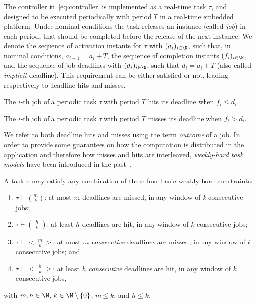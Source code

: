 The controller in~\eqref{eq:controller} is implemented as a real-time task $\tau$, and designed to be executed periodically with period $T$ in a real-time embedded platform.
Under nominal conditions the task releases an instance (called \emph{job}) in each period, that should be completed before the release of the next instance.
We denote the sequence of activation instants for $\tau$ with $(a_i)_{i \in \N}$, such that, in nominal conditions, $a_{i+1} = a_i+T$,  the sequence of completion instants $(f_i)_{i \in \N}$, and the sequence of job deadlines with $(d_i)_{i \in \N}$, such that $d_i = a_i + T$ (also called \emph{implicit} deadline).
This requirement can be either satisfied or not, leading respectively to deadline hits and misses.
%
\begin{definition}%
\label{def:hit}%
    The $i$-th job of a periodic task $\tau$ with period $T$ hits its deadline when $f_i \leq d_i$.
\end{definition}

\begin{definition}%
\label{def:miss}%
    The $i$-th job of a periodic task $\tau$ with period $T$ misses its deadline when $f_i > d_i$.
\end{definition}
%
We refer to both deadline hits and misses using the term \emph{outcome} of a job.
In order to provide some guarantees on how the computation is distributed in the application and therefore how misses and hits are interleaved, \emph{weakly-hard task models} have been introduced in the past~\cite{Bernat:2001}.

\begin{definition}%
\label{def:weakly-hard}%
    A task $\tau$ may satisfy any combination of these four basic weakly
    hard constraints:
    \begin{enumerate}[label=(\roman*)]
        \item \label{item:mk} $\tau \vdash\overbar{\binom{m}{k}}$: at most $m$ deadlines are missed, in any window of $k$ consecutive jobs;
        \item \label{item:hk} $\tau \vdash\binom{h}{\!\:\!\:k\!\:\!\:}$: at least $h$ deadlines are hit, in any window of $k$ consecutive jobs;
        \item \label{item:cons} $\tau \vdash\overbar{\genfrac{<}{>}{0pt}{}{m}{\!\:\!\:k\!\:\!\:}}$: at most $m$ \emph{consecutive} deadlines are missed, in any window of $k$ consecutive jobs; and
        \item $\tau \vdash\genfrac{<}{>}{0pt}{}{h}{\!\:\!\:k\!\:\!\:}$: at least $h$ \emph{consecutive} deadlines are hit, in any window of $k$ consecutive jobs,
    \end{enumerate}
    with $m,h\in \N$, $k \in \N\setminus \left\{ 0 \right\}$, $m\leq k$, and $h\leq k$.
\end{definition}

